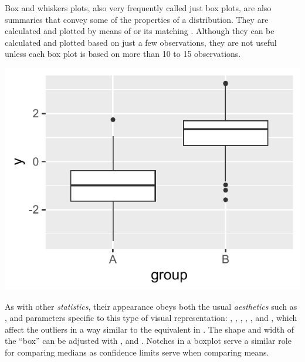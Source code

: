 \documentclass[krantz2]{krantz}\usepackage{knitr}
\begin{document}
Box and whiskers plots, also very frequently called just box plots, are also summaries that convey some of the properties of a distribution. They are calculated and plotted by means of  or its matching . Although they can be calculated and plotted based on just a few observations, they are not useful unless each box plot is based on more than 10 to 15 observations.

\begin{knitrout}\footnotesize
{}\color{fgcolor}\begin{kframe}
\begin{alltt}
  \hlopt{+}
  \hlstd{()}
\end{alltt}
\end{kframe}

{\centering \includegraphics[width=.54\textwidth]{figure/pos-bw-plot-01-1} 

}



\end{knitrout}

As with other \emph{statistics}, their appearance obeys both the usual \emph{aesthetics} such as , and parameters specific to this type of visual representation: , , , , ,  and , which affect the outliers in a way similar to the equivalent  in . The shape and width of the ``box'' can be adjusted with ,  and . Notches in a boxplot serve a similar role for comparing medians as confidence limits serve when comparing means.
\end{document}
